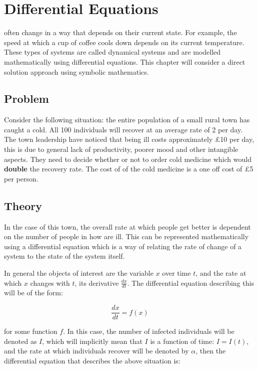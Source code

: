 \chapter[Differential Equations]{Differential Equations}

 often change in a way that depends on their current
state. For example, the speed at which a cup of coffee cools down depends on its
current temperature. These types of systems are called dynamical systems and are
modelled mathematically using differential equations. This chapter will
consider a direct solution approach using symbolic mathematics.

\section{Problem}\label{sec:problem}

Consider the following situation: the entire population of a small rural town
has caught a cold. All 100 individuals will recover at an average rate of 2 per
day. The town leadership have noticed that being ill costs approximately
\pounds10 per day, this is due to general lack of productivity, poorer mood and
other intangible aspects. They need to decide whether or not to order cold
medicine which would \textbf{double} the recovery rate. The cost of of the cold
medicine is a one off cost of \pounds5 per person.

\section{Theory}\label{sec:theory}

In the case of this town, the overall rate at which people get better is
dependent on the number of people in how are ill. This can be represented
mathematically using a differential equation which is a way of relating the rate
of change of a system to the state of the system itself.

In general the objects of interest are the variable \(x\) over time \(t\), and
the rate at which \(x\) changes with \(t\), its derivative \(\frac{dx}{dt}\).
The differential equation describing this will be of the form:

\begin{equation}
    \frac{dx}{dt} = f(x)
\end{equation}

for some function \(f\).
In this case,
the number of infected individuals will be denoted as \(I\), which will
implicitly mean that \(I\) is a function of time: \(I=I(t)\), and the rate at
which individuals recover will be denoted by \(\alpha\), then the
differential equation that describes the above situation is:

